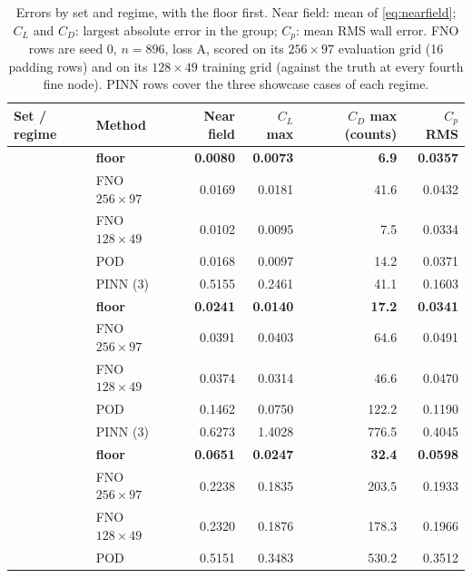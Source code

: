 \documentclass[11pt]{article}
\newcommand{\Cp}{C_p}
\newcommand{\CL}{C_L}
\newcommand{\CD}{C_D}
\begin{document}
\begin{table}[t]
\centering\small
\caption{Errors by set and regime, with the floor first. Near field: mean of
\cref{eq:nearfield}; $\CL$ and $\CD$: largest absolute error in the group; $\Cp$: mean RMS wall
error. FNO rows are seed 0, $n = 896$, loss A, scored on its $256\times97$ evaluation grid (16
padding rows) and on
its $128\times49$ training grid (against the truth at every fourth fine node). PINN rows cover the
three showcase cases of each regime.}
\label{tab:results}
\begin{tabular}{@{}llrrrr@{}}
\toprule
Set / regime & Method & Near field & $\CL$ max & $\CD$ max (counts) & $\Cp$ RMS\\
\midrule
{}
 & \textbf{floor} & \textbf{0.0080} & \textbf{0.0073} & \textbf{6.9} & \textbf{0.0357}\\
 & FNO $256\times97$ & 0.0169 & 0.0181 & 41.6 & 0.0432\\
 & FNO $128\times49$ & 0.0102 & 0.0095 & 7.5 & 0.0334\\
 & POD & 0.0168 & 0.0097 & 14.2 & 0.0371\\
 & PINN (3) & 0.5155 & 0.2461 & 41.1 & 0.1603\\
\midrule
{}
 & \textbf{floor} & \textbf{0.0241} & \textbf{0.0140} & \textbf{17.2} & \textbf{0.0341}\\
 & FNO $256\times97$ & 0.0391 & 0.0403 & 64.6 & 0.0491\\
 & FNO $128\times49$ & 0.0374 & 0.0314 & 46.6 & 0.0470\\
 & POD & 0.1462 & 0.0750 & 122.2 & 0.1190\\
 & PINN (3) & 0.6273 & 1.4028 & 776.5 & 0.4045\\
\midrule
{}
 & \textbf{floor} & \textbf{0.0651} & \textbf{0.0247} & \textbf{32.4} & \textbf{0.0598}\\
 & FNO $256\times97$ & 0.2238 & 0.1835 & 203.5 & 0.1933\\
 & FNO $128\times49$ & 0.2320 & 0.1876 & 178.3 & 0.1966\\
 & POD & 0.5151 & 0.3483 & 530.2 & 0.3512\\
\bottomrule
\end{tabular}
\end{table}
\end{document}
